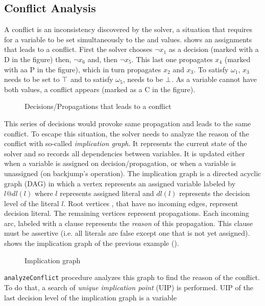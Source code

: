 \subsection{Conflict Analysis}
A conflict is an inconsistency discovered by the solver, a situation that requires for a variable to be set 
simultaneously to the \true and \false values.  shows an assignments that leads to a conflict.
First the solver chooses $\neg x_1$ as a decision (marked with a D in the figure) then, $\neg x_6$ and, then $\neg x_5$. This last one propagates $x_4$ (marked with aa P in the figure),
which in turn propagates $x_2$ and $x_3$.
To satisfy $\omega_1$, $x_3$ needs to be set to $\top$ and  to satisfy $\omega_5$, 
needs to be $\bot$. As a variable cannot have both values, a conflict appears (marked as a C in the figure).
\begin{figure}[!htbp]
 \centering
  
 \caption{Decisions/Propagations that leads to a  conflict}
 \label{fig:conflict}
\end{figure}
This series of decisions would provoke same propagation and leads to the same conflict. To escape this
situation, the solver needs to analyze the reason of the conflict with so-called \emph{implication graph}.
It represents the current state of the solver and so records all dependencies between  variables. It is updated either when a variable is assigned on decision/propagation, or  when a variable
is unassigned (on backjump's operation). The implication graph is a directed acyclic graph (DAG) in which a vertex represents an assigned variable labeled by $l@dl(l)$ where $l$ represents assigned literal and $dl(l)$ represents the decision level of the literal $l$.
Root vertices , that have no incoming edges, represent decision literal. The remaining vertices represent
propagations.
Each incoming arc, labeled with a clause represents the \emph{reason} of this propagation.
This clause must be assertive (i.e. all  literals are false except one that is not yet assigned).
 shows the implication graph of the previous example ().
\begin{figure}[!htbp]
 \centering
 
 \caption{Implication graph}
 \label{fig:implication-graph}
\end{figure}
\texttt{analyzeConflict} procedure analyzes this graph to find the reason of the conflict. To do that, a search of
\emph{unique implication point} (UIP) is performed. UIP of the last decision level of the implication graph is a variable
